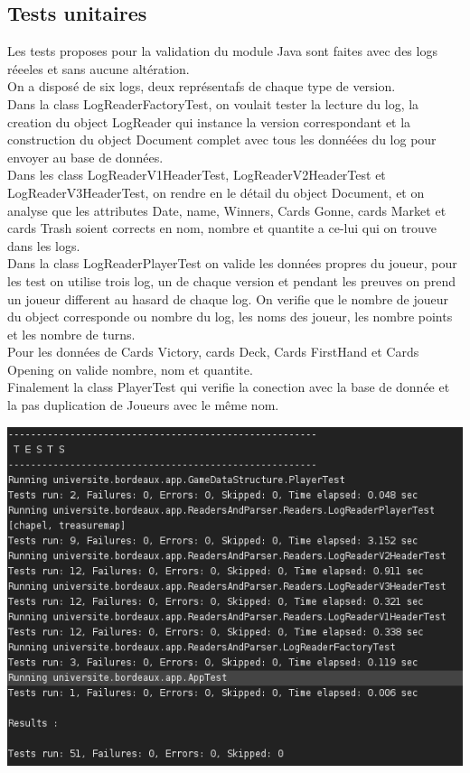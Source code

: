 \subsection{Tests unitaires}

Les tests proposes pour la validation du module Java sont faites avec des logs réeeles et sans aucune altération.\\
On a disposé de six logs, deux représentafs de chaque type de version. \\

Dans la class LogReaderFactoryTest, on voulait tester la lecture du log, la creation du object LogReader qui instance la version correspondant et la construction du object Document complet avec tous les donnéées du log pour envoyer au base de données. \\

Dans les class LogReaderV1HeaderTest, LogReaderV2HeaderTest et LogReaderV3HeaderTest, on rendre en le détail du object Document, et on analyse que les attributes Date, name, Winners, Cards Gonne, cards Market et cards Trash soient corrects en nom, nombre et quantite a ce-lui qui on trouve dans les logs. \\

Dans la class LogReaderPlayerTest on valide les données propres du joueur, pour les test on utilise trois log, un de chaque version et pendant les preuves on prend un joueur different au hasard de chaque log. On verifie que le nombre de joueur du object corresponde ou nombre du log, les noms des joueur, les nombre points et les nombre de turns. \\
Pour les données de Cards Victory, cards Deck, Cards FirstHand et Cards Opening on valide nombre, nom et quantite. \\

Finalement la class PlayerTest qui verifie la conection avec la base de donnée et la pas duplication de Joueurs avec le même nom.

\includegraphics[scale=0.35,keepaspectratio]{./unit_tests_jave}

